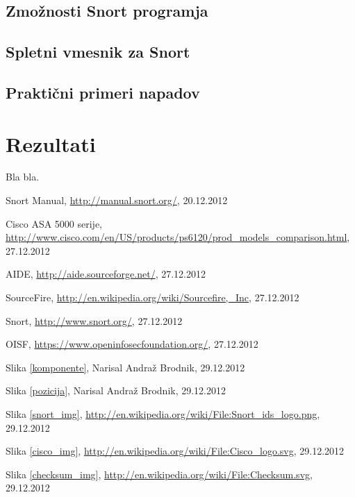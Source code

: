\documentclass[12pt]{article}
\let\stdsection\section
\renewcommand\section{\newpage\stdsection}
\begin{document}
\subsection{Zmožnosti Snort programja}
\subsection{Spletni vmesnik za Snort}
\subsection{Praktični primeri napadov}

\section{Rezultati}

Bla bla.

\clearpage
{}
\begin{thebibliography}{9}


Snort Manual, \url{http://manual.snort.org/}, 20.12.2012

Cisco ASA 5000 serije, \url{http://www.cisco.com/en/US/products/ps6120/prod_models_comparison.html}, 27.12.2012

AIDE, \url{http://aide.sourceforge.net/}, 27.12.2012

SourceFire, \url{http://en.wikipedia.org/wiki/Sourcefire,_Inc}, 27.12.2012

Snort, \url{http://www.snort.org/}, 27.12.2012

OISF, \url{https://www.openinfosecfoundation.org/}, 27.12.2012

Slika \ref{komponente}, 
Narisal Andraž Brodnik, 29.12.2012

Slika \ref{pozicija}, 
Narisal Andraž Brodnik, 29.12.2012

Slika \ref{snort_img}, 
\url{http://en.wikipedia.org/wiki/File:Snort_ids_logo.png}, 29.12.2012

Slika \ref{cisco_img}, 
\url{http://en.wikipedia.org/wiki/File:Cisco_logo.svg}, 29.12.2012

 Slika \ref{checksum_img}, 
\url{http://en.wikipedia.org/wiki/File:Checksum.svg}, 29.12.2012

\end{thebibliography}
\end{document}
